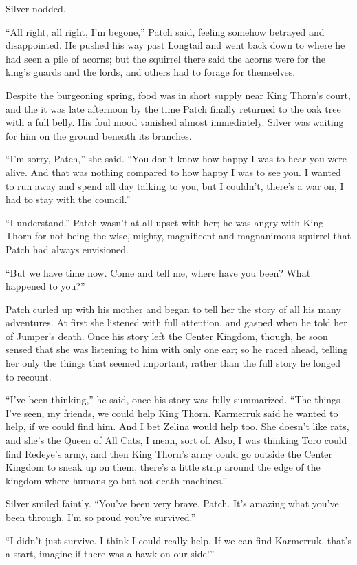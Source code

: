 \documentclass[ebook,oneside,openany,17pt]{memoir}
\begin{document}
Silver nodded.

“All right, all right, I’m begone,” Patch said, feeling somehow
betrayed and disappointed. He pushed his way past Longtail and went
back down to where he had seen a pile of acorns; but the squirrel
there said the acorns were for the king’s guards and the lords, and
others had to forage for themselves.

Despite the burgeoning spring, food was in short supply near King
Thorn’s court, and the it was late afternoon by the time Patch finally
returned to the oak tree with a full belly. His foul mood vanished
almost immediately. Silver was waiting for him on the ground beneath
its branches.

“I’m sorry, Patch,” she said. “You don’t know how happy I was to hear
you were alive. And that was nothing compared to how happy I was to
see you. I wanted to run away and spend all day talking to you, but I
couldn’t, there’s a war on, I had to stay with the council.”

“I understand.” Patch wasn’t at all upset with her; he was angry with
King Thorn for not being the wise, mighty, magnificent and magnanimous
squirrel that Patch had always envisioned.

“But we have time now. Come and tell me, where have you been? What
happened to you?”

Patch curled up with his mother and began to tell her the story of all
his many adventures. At first she listened with full attention, and
gasped when he told her of Jumper’s death. Once his story left the
Center Kingdom, though, he soon sensed that she was listening to him
with only one ear; so he raced ahead, telling her only the things that
seemed important, rather than the full story he longed to recount.

“I’ve been thinking,” he said, once his story was fully
summarized. “The things I’ve seen, my friends, we could help King
Thorn. Karmerruk said he wanted to help, if we could find him. And I
bet Zelina would help too. She doesn’t like rats, and she’s the Queen
of All Cats, I mean, sort of. Also, I was thinking Toro could find
Redeye’s army, and then King Thorn’s army could go outside the Center
Kingdom to sneak up on them, there’s a little strip around the edge of
the kingdom where humans go but not death machines.”

Silver smiled faintly. “You’ve been very brave, Patch. It’s amazing
what you’ve been through. I’m so proud you’ve survived.”

“I didn’t just survive. I think I could really help. If we can find
Karmerruk, that’s a start, imagine if there was a hawk on our side!”
\end{document}
